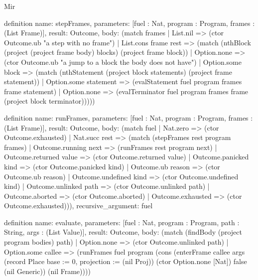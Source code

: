 \begin{lexlean}{Mir}
\begin{semanticmodule}
definition{
  name: stepFrames,
  parameters: [fuel : Nat, program : Program, frames : (List Frame)],
  result: Outcome,
  body: (match frames
    | List.nil => (ctor Outcome.ub "a step with no frame")
    | List.cons frame rest => (match (nthBlock (project (project frame body) blocks) (project frame block))
      | Option.none => (ctor Outcome.ub "a jump to a block the body does not have")
      | Option.some block => (match (nthStatement (project block statements) (project frame statement))
        | Option.some statement => (evalStatement fuel program frames frame statement)
        | Option.none => (evalTerminator fuel program frames frame (project block terminator)))))
}

definition{
  name: runFrames,
  parameters: [fuel : Nat, program : Program, frames : (List Frame)],
  result: Outcome,
  body: (match fuel
    | Nat.zero => (ctor Outcome.exhausted)
    | Nat.succ rest => (match (stepFrames rest program frames)
      | Outcome.running next => (runFrames rest program next)
      | Outcome.returned value => (ctor Outcome.returned value)
      | Outcome.panicked kind => (ctor Outcome.panicked kind)
      | Outcome.ub reason => (ctor Outcome.ub reason)
      | Outcome.undefined kind => (ctor Outcome.undefined kind)
      | Outcome.unlinked path => (ctor Outcome.unlinked path)
      | Outcome.aborted => (ctor Outcome.aborted)
      | Outcome.exhausted => (ctor Outcome.exhausted))),
  recursive_argument: fuel
}

definition{
  name: evaluate,
  parameters: [fuel : Nat, program : Program, path : String, args : (List Value)],
  result: Outcome,
  body: (match (findBody (project program bodies) path)
    | Option.none => (ctor Outcome.unlinked path)
    | Option.some callee => (runFrames fuel program (cons (enterFrame callee args (record Place {base := 0, projection := (nil Proj)}) (ctor Option.none [Nat]) false (nil Generic)) (nil Frame))))
}
\end{semanticmodule}
\end{lexlean}
